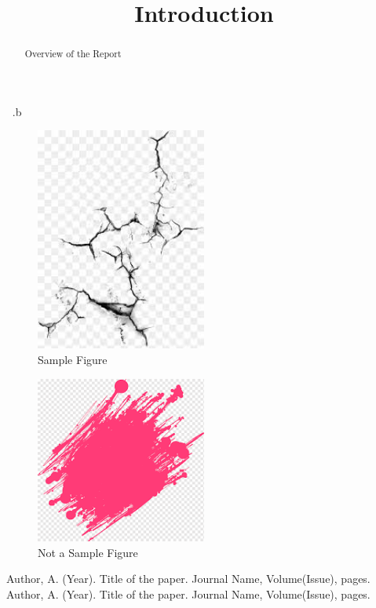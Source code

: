 \documentclass{article}
\begin{document}
\newpage
\title{Introduction}
\begin{abstract}
Overview of the Report
\end{abstract}
 .b\begin{figure}[h!]
\centering
\includegraphics[width=0.5\textwidth]{figure1.png}
\caption{Sample Figure}
\end{figure}
\begin{figure}[h!]
\centering
\includegraphics[width=0.5\textwidth]{figure2.png}
\caption{Not a Sample Figure}
\end{figure}
\begin{thebibliography}{100}
Author, A. (Year). Title of the paper. Journal Name, Volume(Issue), pages.
Author, A. (Year). Title of the paper. Journal Name, Volume(Issue), pages.
\end{thebibliography}
\end{document}
